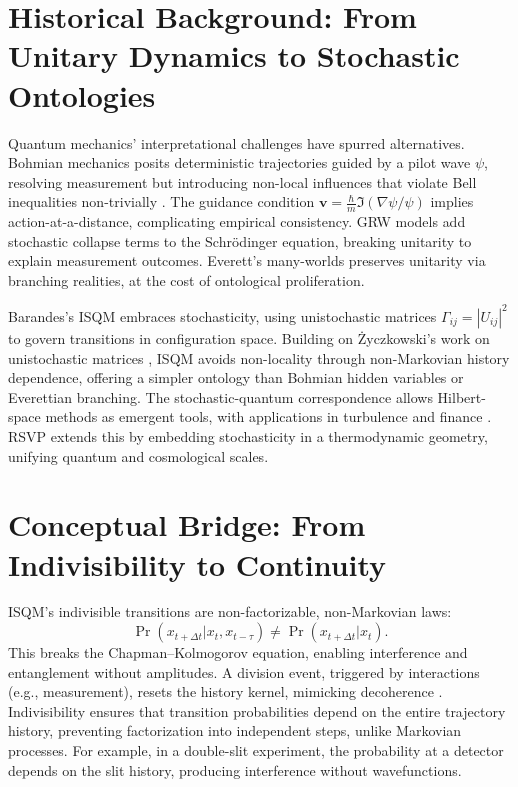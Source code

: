 \documentclass[12pt]{article}
\begin{document}
\section{Historical Background: From Unitary Dynamics to Stochastic Ontologies}

Quantum mechanics’ interpretational challenges have spurred alternatives. Bohmian mechanics \cite{Bohm1952} posits deterministic trajectories guided by a pilot wave \(\psi\), resolving measurement but introducing non-local influences that violate Bell inequalities non-trivially \cite{Bell1987}. The guidance condition \(\mathbf{v} = \frac{\hbar}{m} \Im (\nabla \psi / \psi)\) implies action-at-a-distance, complicating empirical consistency. GRW models \cite{Ghirardi1986} add stochastic collapse terms to the Schrödinger equation, breaking unitarity to explain measurement outcomes. Everett’s many-worlds \cite{Everett1957} preserves unitarity via branching realities, at the cost of ontological proliferation.

Barandes’s ISQM \cite{Barandes2023} embraces stochasticity, using unistochastic matrices \(\Gamma_{ij} = |U_{ij}|^2\) to govern transitions in configuration space. Building on Życzkowski’s work on unistochastic matrices \cite{Zyczkowski1994, Zyczkowski2003}, ISQM avoids non-locality through non-Markovian history dependence, offering a simpler ontology than Bohmian hidden variables or Everettian branching. The stochastic-quantum correspondence allows Hilbert-space methods as emergent tools, with applications in turbulence and finance \cite{Stratonovich1963}. RSVP extends this by embedding stochasticity in a thermodynamic geometry, unifying quantum and cosmological scales.

\section{Conceptual Bridge: From Indivisibility to Continuity}

ISQM’s indivisible transitions are non-factorizable, non-Markovian laws:
\[
\Pr(x_{t + \Delta t} | x_t, x_{t - \tau}) \neq \Pr(x_{t + \Delta t} | x_t).
\]
This breaks the Chapman–Kolmogorov equation, enabling interference and entanglement without amplitudes. A division event, triggered by interactions (e.g., measurement), resets the history kernel, mimicking decoherence \cite{Barandes2023}. Indivisibility ensures that transition probabilities depend on the entire trajectory history, preventing factorization into independent steps, unlike Markovian processes. For example, in a double-slit experiment, the probability at a detector depends on the slit history, producing interference without wavefunctions.
\end{document}
